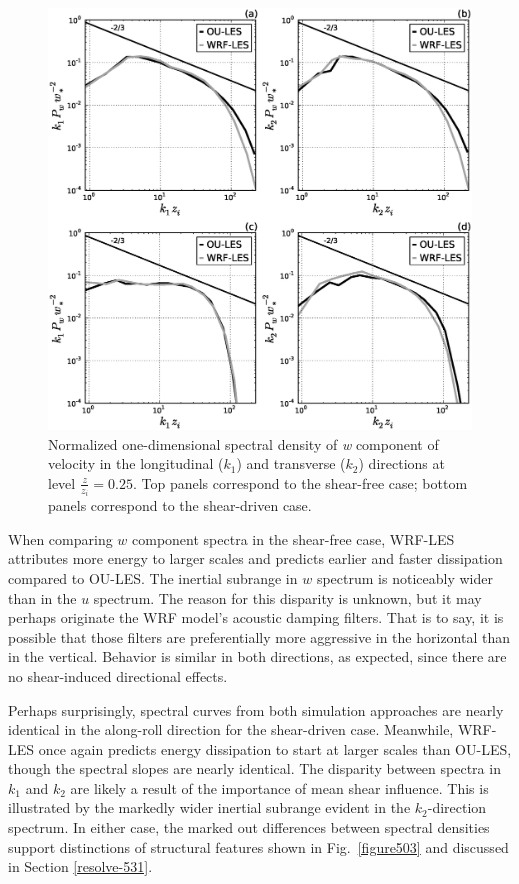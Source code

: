 \begin{figure}[!ht]
\begin{center}
\includegraphics[width=\textwidth]{figures/chapter5/spectra1D_w}
\end{center}
\caption{Normalized one-dimensional spectral density of \textit{w} component of velocity in the longitudinal ($k_1$) and transverse ($k_2$) directions at level $\frac{z}{z_i}=0.25$. Top panels correspond to the shear-free case; bottom panels correspond to the shear-driven case.}
\label{figure505}
\end{figure}


When comparing $w$ component spectra in the shear-free case, WRF-LES attributes more energy to larger scales and predicts earlier and faster dissipation compared to OU-LES. The inertial subrange in $w$ spectrum is noticeably wider than in the $u$ spectrum. The reason for this disparity is unknown, but it may perhaps originate the WRF model's acoustic damping filters. That is to say, it is possible that those filters are preferentially more aggressive in the horizontal than in the vertical. Behavior is similar in both directions, as expected, since there are no shear-induced directional effects. 

Perhaps surprisingly, spectral curves from both simulation approaches are nearly identical in the along-roll direction for the shear-driven case. Meanwhile, WRF-LES once again predicts energy dissipation to start at larger scales than OU-LES, though the spectral slopes are nearly identical. The disparity between spectra in $k_1$ and $k_2$ are likely a result of the importance of mean shear influence. This is illustrated by the markedly wider inertial subrange evident in the $k_2$-direction spectrum. In either case, the marked out differences between spectral densities support distinctions of structural features shown in Fig.~\ref{figure503} and discussed in Section \autoref{resolve-531}.

